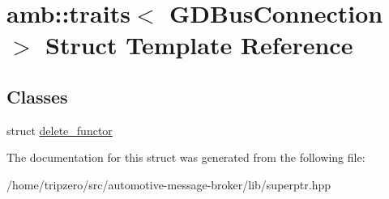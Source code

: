 \hypertarget{structamb_1_1traits_3_01GDBusConnection_01_4}{\section{amb\-:\-:traits$<$ G\-D\-Bus\-Connection $>$ Struct Template Reference}
\label{structamb_1_1traits_3_01GDBusConnection_01_4}
}
\subsection*{Classes}
\begin{DoxyCompactItemize}
\item 
struct \hyperlink{structamb_1_1traits_3_01GDBusConnection_01_4_1_1delete__functor}{delete\-\_\-functor}
\end{DoxyCompactItemize}


The documentation for this struct was generated from the following file\-:\begin{DoxyCompactItemize}
\item 
/home/tripzero/src/automotive-\/message-\/broker/lib/superptr.\-hpp\end{DoxyCompactItemize}
